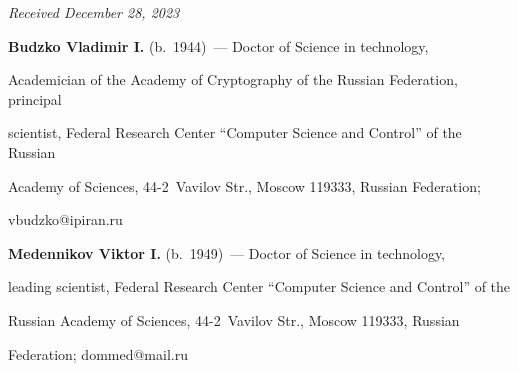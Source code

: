 \vspace*{-6pt}





\hfill{\small\textit{Received December 28, 2023}} 





\vspace*{-12pt} 





\Contr





\vspace*{-3pt}





\noindent


\textbf{Budzko Vladimir I.} (b.\ 1944)~--- Doctor of Science in technology, 


Academician of the Academy of Cryptography of the Russian Federation, principal 


scientist, Federal Research Center ``Computer Science and Control'' of the Russian 


Academy of Sciences, 44-2~Vavilov Str., Moscow 119333, Russian Federation; 


\mbox{vbudzko@ipiran.ru}





\vspace*{3pt}





\noindent


\textbf{Medennikov Viktor I.} (b.\ 1949)~--- Doctor of Science in technology, 


leading scientist, Federal Research Center ``Computer Science and Control'' of the 


Russian Academy of Sciences, 44-2~Vavilov Str., Moscow 119333, Russian 


Federation; \mbox{dommed@mail.ru} 





  





  


\label{end\stat}





\renewcommand{\bibname}{\protect\rm Литература} 


